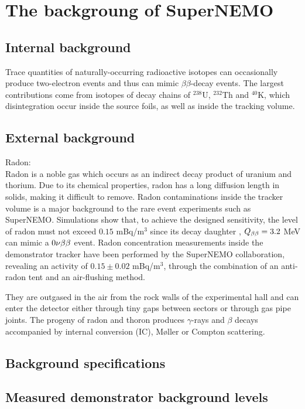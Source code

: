 \section{The backgroung of SuperNEMO}
\label{sec:SNbkg}
\subsection{Internal background}
\label{subsec:SNbkg_internal}

Trace quantities of naturally-occurring radioactive isotopes can occasionally produce two-electron events and thus can mimic $\beta\beta$-decay events.
The largest contributions come from isotopes of decay chains of $^{238}$U, $^{232}$Th and $^{40}$K, which disintegration occur inside the source foils, as well as inside the tracking volume.


\subsection{External background}
Radon:\\
Radon is a noble gas which occurs as an indirect decay product of uranium and thorium.
Due to its chemical properties, radon has a long diffusion length in solids, making it difficult to remove.
Radon contaminations inside the tracker volume is a major background to the rare event experiments such as SuperNEMO.
Simulations show that, to achieve the designed sensitivity, the level of radon must not exceed $0.15$ mBq/m$^{3}$ since its decay daughter \Bi, $Q_{\beta\beta}= 3.2$ MeV can mimic a $0\nu\beta\beta$ event.
Radon concentration measurements inside the demonstrator tracker have been performed by the SuperNEMO collaboration, revealing an activity of $0.15\pm0.02$ mBq/m$^{3}$, through the combination of an anti-radon tent and an air-flushing method.

They are outgased in the air from the rock walls of the experimental hall and can enter the detector either through tiny gaps between sectors or through gas pipe joints.
The progeny of radon and thoron produces $\gamma$-rays and $\beta$ decays accompanied by internal conversion (IC), Møller or Compton scattering.
\subsection{Background specifications}
\subsection{Measured demonstrator background levels}

